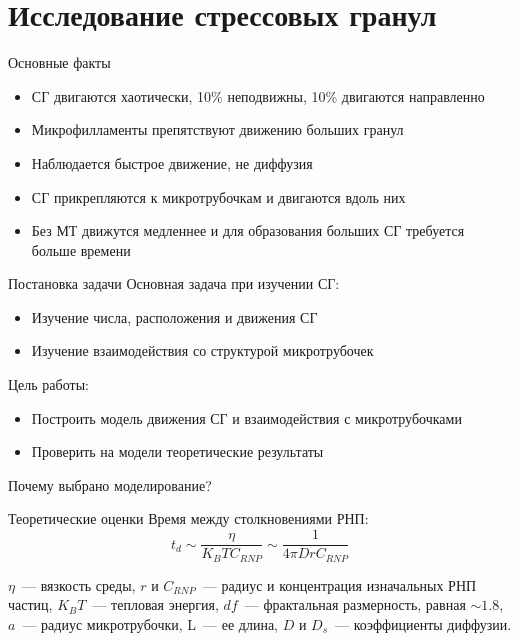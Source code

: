 \documentclass{beamer}
\begin{document}
\section{Исследование стрессовых гранул}
\begin{frame}{Основные факты}
\begin{itemize}
\item СГ двигаются хаотически, 10\% неподвижны, 10\% двигаются направленно
\item Микрофилламенты препятствуют движению больших гранул
\item Наблюдается быстрое движение, не диффузия
\item СГ прикрепляются к микротрубочкам и двигаются вдоль них
\item Без МТ движутся медленнее и для образования больших СГ требуется больше времени
\end{itemize}
\end{frame}

\begin{frame}{Постановка задачи}
Основная задача при изучении СГ:
\begin{itemize}
\item Изучение числа, расположения и движения СГ
\item Изучение взаимодействия со структурой микротрубочек
\end{itemize}

Цель работы:
\begin{itemize}
\item Построить модель движения СГ и взаимодействия с микротрубочками
\item Проверить на модели теоретические результаты
\end{itemize}

Почему выбрано моделирование?
\end{frame}

\begin{frame}{Теоретические оценки}
Время между столкновениями РНП:
\begin{equation}
t_d \sim \frac{\eta}{K_B T C_{RNP}} \sim \frac{1}{4 \pi D r C_{RNP}}
\end{equation}


{
\small
$\eta$~--- вязкость среды,
$r$ и $C_{RNP}$~--- радиус и концентрация изначальных РНП частиц,
$K_B T$~--- тепловая энергия,
$df$~--- фрактальная размерность, равная $\sim1.8$,
$a$~--- радиус микротрубочки,
L~--- ее длина,
$D$ и $D_s$~--- коэффициенты диффузии.
}
\end{frame}
\end{document}
